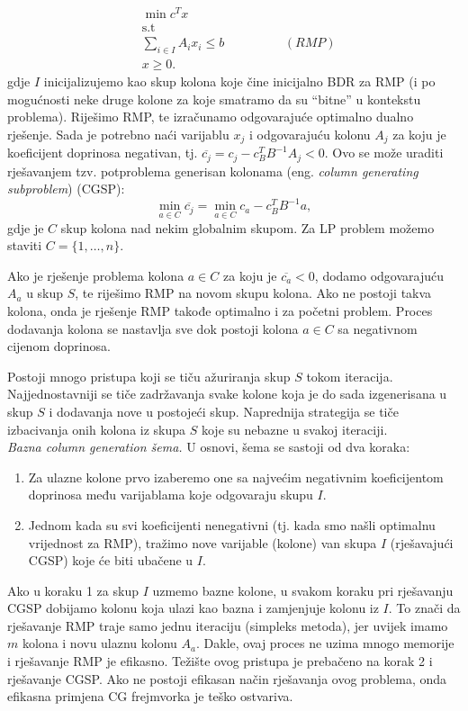 \documentclass[a4paper, utf8, 11pt, colorlinks]{book}
\begin{document}
\begin{align*}
    &\min c^T x \\
    &\mbox{s.t} \\
    & \sum_{i \in I} A_i x_i  \leq b \hspace{2cm} (RMP)\\
    & x \geq 0. 
\end{align*}
gdje $I$ inicijalizujemo kao skup kolona koje čine inicijalno BDR za RMP (i po mogućnosti neke druge kolone za koje smatramo da su ``bitne'' u kontekstu problema).  Riješimo RMP,  te izračunamo odgovarajuće optimalno dualno rješenje. Sada je potrebno naći varijablu $x_j$ i odgovarajuću kolonu $A_j$ za koju je koeficijent doprinosa negativan, tj. $\overline{c_j} = c_j - c_B^T B^{-1}A_j < 0$.
Ovo se može uraditi rješavanjem tzv. potproblema generisan kolonama (eng. \emph{column generating subproblem}) (CGSP):
$$\min_{a \in C} \overline{c_j} = \min_{a \in C} c_a - c_B^T B^{-1} a,$$
gdje je $C$ skup kolona nad nekim globalnim skupom. Za LP problem možemo staviti $C = \{1,\ldots,n\}$. 

Ako je rješenje problema kolona $a \in C$ za koju je $\overline{c_a}<0$, dodamo odgovarajuću $A_a$ u skup $S$, te riješimo  RMP na novom skupu kolona. Ako ne postoji takva kolona, onda je rješenje RMP takođe optimalno i za početni problem. %
 Proces dodavanja kolona se nastavlja sve dok postoji kolona $a\in C$ sa negativnom cijenom doprinosa. 

Postoji mnogo pristupa koji se tiču ažuriranja skup $S$ tokom iteracija. 
Najjednostavniji se tiče zadržavanja svake kolone koja je do sada izgenerisana  u skup $S$ i dodavanja  nove u postojeći skup. Naprednija strategija se tiče izbacivanja onih kolona iz skupa $S$ koje su nebazne u svakoj iteraciji. \\

\emph{Bazna column generation šema.} U osnovi, šema se sastoji od dva koraka:
\begin{enumerate}
	\item  Za ulazne kolone prvo izaberemo one sa najvećim negativnim koeficijentom doprinosa među varijablama koje odgovaraju skupu $I$.
	\item Jednom kada su svi koeficijenti nenegativni (tj. kada smo našli optimalnu vrijednost za  RMP), tražimo nove varijable (kolone) van skupa $I$ (rješavajući CGSP) koje će biti ubačene u $I$. 
\end{enumerate}
Ako u koraku 1 za skup $I$ uzmemo bazne kolone, u svakom koraku pri rješavanju CGSP dobijamo kolonu koja ulazi kao bazna i zamjenjuje kolonu iz $I$. To znači da rješavanje RMP traje samo jednu iteraciju (simpleks metoda), jer uvijek imamo $m$ kolona i novu ulaznu kolonu $A_a$. Dakle, ovaj proces ne uzima mnogo memorije i rješavanje RMP je efikasno. Težište ovog pristupa je   prebačeno na korak 2 i rješavanje CGSP. Ako ne postoji efikasan način rješavanja ovog problema, onda efikasna primjena CG frejmvorka je teško ostvariva.  
 
\end{document}
